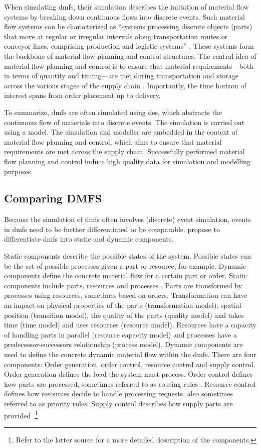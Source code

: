 When simulating \gls{dmfs}, their simulation describes the imitation of material flow systems by breaking down continuous flows into discrete events. Such material flow systems can be characterized as “systems processing discrete objects (parts) that move at regular or irregular intervals along transportation routes or conveyor lines, comprising production and logistic systems” \autocite{Arnold2006,Schwede2024}. These systems form the backbone of material flow planning and control structures. The central idea of material flow planning and control is to ensure that material requirements—both in terms of quantity and timing—are met during transportation and storage across the various stages of the supply chain \autocite{Gehr2007}. Importantly, the time horizon of interest spans from order placement up to delivery.

To summarize, \gls{dmfs} are often simulated using \gls{des}, which abstracts the continuous flow of materials into discrete events. The simulation is carried out using a model. The simulation and modeller are embedded in the context of material flow planning and control, which aims to ensure that material requirements are met across the supply chain. Successfully performed material flow planning and control induce high quality data for simulation and modelling purposes.

\subsection{Comparing DMFS}
\label{sec:comparing-dmfs}
Because the simulation of \gls{dmfs} often involves (discrete) event simulation, events in \gls{dmfs} need to be further differentiated to be comparable. \Textcite{Arnold2006} propose to differentiate \gls{dmfs} into static and dynamic components.

Static components describe the possible states of the system. Possible states can be the set of possible processes given a part or resource, for example. Dynamic components define the concrete material flow for a certain part or order.
Static components include parts, resources and processes \autocite{Schwede2024}. Parts are transformed by processes using resources, sometimes based on orders. Transformation can have an impact on physical properties of the parts (transformation model), spatial position (transition model), the quality of the parts (quality model) and takes time (time model) and uses resources (resource model). Resources have a capacity of handling parts in parallel (resource capacity model) and processes have a predecessor-successors relationship (process model).
Dynamic components are used to define the concrete dynamic material flow within the \gls{dmfs}. There are four components: Order generation, order control, resource control and supply control. Order generation defines the load the system must process. Order control defines how parts are processed, sometimes referred to as routing rules \autocite{mildeautomated}. Resource control defines how resources decide to handle processing requests, also sometimes referred to as priority rules. Supply control describes how supply parts are provided \autocite{mildeautomated,Schwede2024}.\footnote{Refer to the latter source for a more detailed description of the components.}


